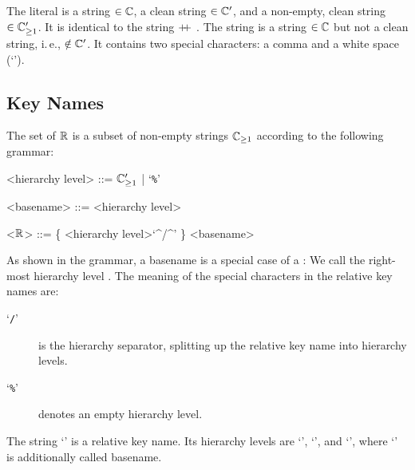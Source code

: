 \begin{example}
The literal  is a string $\in \mathbb{C}$, a clean string $\in \mathbb{C}'$, and a non-empty, clean string $\in \mathbb{C}_{\geq1}'$.
It is identical to the string  $\operatorname*{\mathnormal{+\!\!+}}$ .
The string  is a string $\in \mathbb{C}$ but not a clean string, i.\,e., $\notin \mathbb{C}'$.
It contains two special characters: a comma and a white space (\lq\WhiteSpace').
\end{example}



\subsection{Key Names}
\label{sec:key-name}
\label{sec:key}


\begin{definition}
\label{def:basename}
\label{def:relative-key-name}
The set of  $\mathbb{R}$ is a subset of non-empty strings $\mathbb{C}_{\geq1}$ according to the following grammar:
\begin{grammar}
<hierarchy level> ::= $\mathbb{C}_{\geq1}'$ | \lq\texttt{\%}'

<basename> ::= <hierarchy level>

\let\sl\syntleft
\let\sr\syntright
\StashGrammar
<$\mathbb{R}$> ::= \{ <\sl hierarchy level>\sr \lq^/^' \} <\sl basename>\sr
\end{grammar}
\end{definition}

As shown in the grammar, a basename is a special case of a :
We call the right-most hierarchy level .
The meaning of the special characters in the relative key names are:

\begin{description}
\item[\lq\texttt{/}'] is the hierarchy separator, splitting up the relative key name into hierarchy levels.
\item[\lq\texttt{\%}'] denotes an empty hierarchy level.
\end{description}

\begin{example}
The string \lq{}' is a relative key name.
Its hierarchy levels are \lq{}', \lq\key{\%}', and \lq{}', where \lq{}' is additionally called basename.
\end{example}

